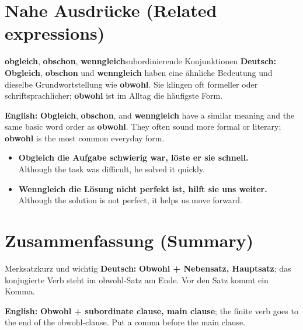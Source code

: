 \documentclass[a4paper,11pt]{article}
\newcommand{\GermanText}[1]{\textbf{Deutsch: }#1\par}
\newcommand{\EnglishText}[1]{{\small\color{SoftGray}\textbf{English: }#1\par}}
\newcommand{\ExampleItem}[2]{\item \textbf{#1}\\{\small\color{SoftGray}#2}}
\begin{document}
\section{Nahe Ausdrücke \textnormal{(Related expressions)}}
\begin{grammarentry}{\textbf{obgleich}, \textbf{obschon}, \textbf{wenngleich}}{subordinierende Konjunktionen}
\GermanText{\textbf{Obgleich}, \textbf{obschon} und \textbf{wenngleich} haben eine ähnliche Bedeutung und dieselbe Grundwortstellung wie \textbf{obwohl}. Sie klingen oft formeller oder schriftsprachlicher; \textbf{obwohl} ist im Alltag die häufigste Form.}
\EnglishText{\textbf{Obgleich}, \textbf{obschon}, and \textbf{wenngleich} have a similar meaning and the same basic word order as \textbf{obwohl}. They often sound more formal or literary; \textbf{obwohl} is the most common everyday form.}
\end{grammarentry}
\begin{exbox}\begin{itemize}
\ExampleItem{Obgleich die Aufgabe schwierig war, löste er sie schnell.}{Although the task was difficult, he solved it quickly.}
\ExampleItem{Wenngleich die Lösung nicht perfekt ist, hilft sie uns weiter.}{Although the solution is not perfect, it helps us move forward.}
\end{itemize}\end{exbox}

\section{Zusammenfassung \textnormal{(Summary)}}
\begin{grammarentry}{Merksatz}{kurz und wichtig}
\GermanText{\textbf{Obwohl + Nebensatz, Hauptsatz}; das konjugierte Verb steht im obwohl-Satz am Ende. Vor den Satz kommt ein Komma.}
\EnglishText{\textbf{Obwohl + subordinate clause, main clause}; the finite verb goes to the end of the obwohl-clause. Put a comma before the main clause.}
\end{grammarentry}
\end{document}
